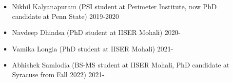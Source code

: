 \begin{itemize}
\vspace{1mm} 
  \item  Nikhil Kalyanapuram (PSI student at Perimeter Institute, now PhD candidate at Penn State) \hfill  2019-2020 
  \item  Navdeep Dhindsa (PhD student at IISER Mohali) \hfill 2020- 
  \item  Vamika Longia (PhD student at IISER Mohali) \hfill 2021- 
  \item  Abhishek Samlodia (BS-MS student at IISER Mohali, PhD candidate at Syracuse from Fall 2022) \hfill 2021- 
  \end{itemize}
